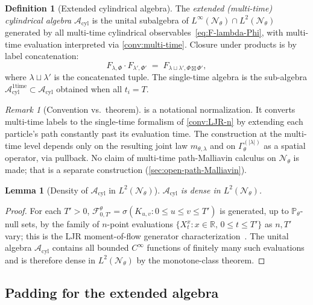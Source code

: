 \documentclass[11pt,reqno]{amsart}
\theoremstyle{plain}
\newtheorem{lemma}[theorem]{Lemma}
\theoremstyle{definition}
\newtheorem{definition}[theorem]{Definition}
\theoremstyle{remark}
\newtheorem{remark}[theorem]{Remark}
\newcommand{\R}{\mathbb R}
\newcommand{\Prob}{\mathbb P}
\newcommand{\cA}{\mathcal A}
\newcommand{\cF}{\mathcal F}
\newcommand{\cN}{\mathcal N}
\newcommand{\Acyl}{\cA_{\mathrm{cyl}}}
\newcommand{\Aone}{\cA_{\mathrm{cyl}}^{\mathrm{1time}}}
\newcommand{\GamM}[1]{\Gamma^{(#1)}_{\theta}}
\newcommand{\Pth}{\Prob_{\theta}}
\begin{document}
\begin{definition}[Extended cylindrical algebra]\label{def:cyl-algebra}
The \emph{extended (multi-time) cylindrical algebra} $\Acyl$ is the
unital subalgebra of
$L^{\infty}(\cN_{\theta})\cap L^{2}(\cN_{\theta})$ generated by all
multi-time cylindrical observables~\eqref{eq:F-lambda-Phi}, with
multi-time evaluation interpreted via \cref{conv:multi-time}.
Closure under products is by label concatenation:
\begin{equation}\label{eq:product-rule}
  F_{\lambda,\Phi}\cdot F_{\lambda',\Phi'}
  \;=\;F_{\lambda\sqcup\lambda',\Phi\boxtimes\Phi'},
\end{equation}
where $\lambda\sqcup\lambda'$ is the concatenated tuple. The
single-time algebra is the sub-algebra $\Aone\subset\Acyl$
obtained when all $t_{i}=T$.
\end{definition}

\begin{remark}[Convention vs.\ theorem]\label{rem:conv-not-theorem}
 is a notational normalization. It converts
multi-time labels to the single-time formalism of
\cref{conv:LJR-n} by extending each particle's path constantly past
its evaluation time. The construction at the multi-time level
depends only on the resulting joint law $m_{\theta,\lambda}$ and on
$\GamM{|\lambda|}$ as a spatial operator, via pullback. No claim of
multi-time path-Malliavin calculus on $\cN_{\theta}$ is made; that
is a separate construction (\cref{sec:open-path-Malliavin}).
\end{remark}

\begin{lemma}[Density of $\Acyl$ in $L^{2}(\cN_{\theta})$]\label{lem:cyl-dense}
$\Acyl$ is dense in $L^{2}(\cN_{\theta})$.
\end{lemma}

\begin{proof}
For each $T'>0$, $\cF^{\theta}_{0,T'}=\sigma(K_{u,v}:0\le u\le v\le T')$
is generated, up to $\Pth$-null sets, by the family of $n$-point
evaluations $\{X^{x}_{t}:x\in\R,\,0\le t\le T'\}$ as $n,T'$ vary;
this is the LJR moment-of-flow generator
characterization~\cite[Prop.~3.1 and Thm.~6.1]{LeJanRaimond2004}.
The unital algebra $\Acyl$ contains all bounded $C^{\infty}$
functions of finitely many such evaluations and is therefore dense
in $L^{2}(\cN_{\theta})$ by the monotone-class theorem.
\end{proof}

\subsection{Padding for the extended algebra}\label{sec:cyl-padding}
\end{document}
